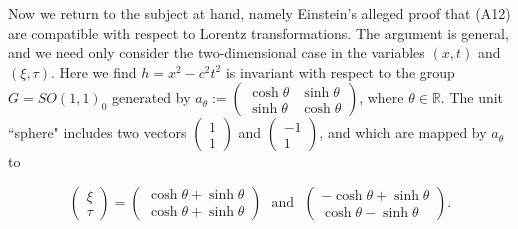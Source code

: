 \documentclass[12pt]{amsart}
\theoremstyle{definition}
\theoremstyle{remark}
\newcommand{\bR}{\mathbb{R}}
\begin{document}

Now we return to the subject at hand, namely Einstein's alleged proof that (A12) are compatible with respect to Lorentz transformations. The argument is general, and we need only consider the two-dimensional case in the variables $(x,t)$ and $(\xi, \tau)$. Here we find $h=x^2-c^2 t^2$ is invariant with respect to the group $G=SO(1,1)_0$ generated by $a_\theta:=\begin{pmatrix} \cosh \theta & \sinh \theta \\
\sinh \theta & \cosh \theta
\end{pmatrix}$, where $\theta\in \bR$. The unit ``sphere" includes two vectors 
$\begin{pmatrix} 1 \\ 1\end{pmatrix}$ and $\begin{pmatrix} -1 \\ 1\end{pmatrix}$, and which are mapped by $a_\theta$ to 

$$\begin{pmatrix} \xi \\ \tau \end{pmatrix}=\begin{pmatrix} \cosh \theta+\sinh \theta \\ \cosh \theta+\sinh \theta \end{pmatrix} \text{~~and~~} \begin{pmatrix} -\cosh \theta+\sinh \theta \\ \cosh \theta-\sinh \theta \end{pmatrix}.$$

\end{document}
